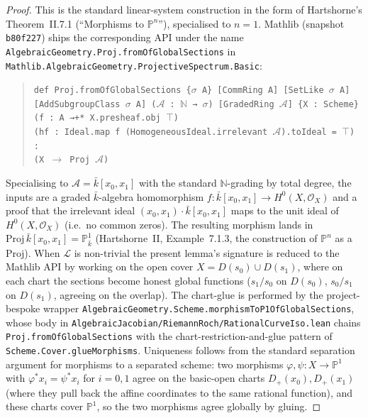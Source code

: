 \begin{proof}



\leanok
  This is the standard linear-system construction in the form of
  Hartshorne's Theorem~II.7.1 (``Morphisms to \(\mathbb P^n\)''), specialised to
  \(n = 1\). Mathlib (snapshot \texttt{b80f227}) ships the corresponding API
  under the name
  \texttt{AlgebraicGeometry.Proj.fromOfGlobalSections} in
  \texttt{Mathlib.AlgebraicGeometry.ProjectiveSpectrum.Basic}:
  \begin{quote}
  \small
  \texttt{def Proj.fromOfGlobalSections \{\(\sigma\) A\} [CommRing A]
    [SetLike \(\sigma\) A] [AddSubgroupClass \(\sigma\) A] (\(\mathcal A\) :
    \(\mathbb N\) → \(\sigma\)) [GradedRing \(\mathcal A\)] \{X : Scheme\}\\
    \phantom{}\quad(f : A →+* X.presheaf.obj \(\top\))\\
    \phantom{}\quad(hf : Ideal.map f (HomogeneousIdeal.irrelevant \(\mathcal A\)).toIdeal = \(\top\)) :\\
    \phantom{}\quad(X \(\longrightarrow\) Proj \(\mathcal A\))}
  \end{quote}
  Specialising to \(\mathcal A = \bar k[x_0, x_1]\) with the standard $\mathbb
  N$-grading by total degree, the inputs are a graded $\bar k$-algebra
  homomorphism \(f \colon \bar k[x_0, x_1] \to H^0(X, \mathcal O_X)\) and a
  proof that the irrelevant ideal \((x_0, x_1) \cdot \bar k[x_0, x_1]\) maps to
  the unit ideal of \(H^0(X, \mathcal O_X)\) (i.e.\ no common zeros). The
  resulting morphism lands in $\mathrm{Proj}\,\bar k[x_0, x_1] = \mathbb
  P^1_{\bar k}$ (Hartshorne~II, Example~7.1.3, the construction of $\mathbb
  P^n$ as a $\mathrm{Proj}$). When $\mathcal L$ is non-trivial the present
  lemma's signature is reduced to the Mathlib API by working on the open
  cover \(X = D(s_0) \cup D(s_1)\), where on each chart the sections become
  honest global functions (\(s_1 / s_0\) on \(D(s_0)\), \(s_0 / s_1\) on \(D(s_1)\),
  agreeing on the overlap). The chart-glue is performed by the
  project-bespoke wrapper
  \texttt{AlgebraicGeometry.Scheme.morphismToP1OfGlobalSections}, whose body
  in \texttt{AlgebraicJacobian/RiemannRoch/RationalCurveIso.lean} chains
  \texttt{Proj.fromOfGlobalSections} with the chart-restriction-and-glue
  pattern of \texttt{Scheme.Cover.glueMorphisms}.
  Uniqueness follows from the standard separation argument for morphisms to
  a separated scheme: two morphisms \(\varphi, \psi \colon X \to \mathbb P^1\)
  with \(\varphi^* x_i = \psi^* x_i\) for \(i = 0, 1\) agree on the basic-open
  charts \(D_+(x_0), D_+(x_1)\) (where they pull back the affine coordinates to
  the same rational function), and these charts cover \(\mathbb P^1\), so the
  two morphisms agree globally by gluing.
\end{proof}
